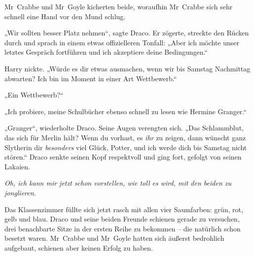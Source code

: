 Mr~Crabbe und Mr~Goyle kicherten beide, woraufhin Mr~Crabbe sich sehr schnell eine Hand vor den Mund schlug.

„Wir sollten besser Platz nehmen“, sagte Draco. Er zögerte, streckte den Rücken durch und sprach in einem etwas offizielleren Tonfall: „Aber ich möchte unser letztes Gespräch fortführen und ich akzeptiere deine Bedingungen.“

Harry nickte. „Würde es dir etwas ausmachen, wenn wir bis Samstag Nachmittag abwarten? Ich bin im Moment in einer Art Wettbewerb.“

„Ein Wettbewerb?“

„Ich probiere, meine Schulbücher ebenso schnell zu lesen wie Hermine Granger.“

„Granger“, wiederholte Draco. Seine Augen verengten sich. „Das Schlammblut, das sich für Merlin hält? Wenn du vorhast, es \emph{ihr} zu zeigen, dann wünscht ganz Slytherin dir \emph{besonders} viel Glück, Potter, und ich werde dich bis Samstag nicht stören.“ Draco senkte seinen Kopf respektvoll und ging fort, gefolgt von seinen Lakaien.

\emph{Oh, ich kann mir jetzt schon vorstellen, wie toll es wird, mit den beiden zu jonglieren.}

Das Klassenzimmer füllte sich jetzt rasch mit allen vier Saumfarben: grün, rot, gelb und blau. Draco und seine beiden Freunde schienen gerade zu versuchen, drei benachbarte Sitze in der ersten Reihe zu bekommen – die natürlich schon besetzt waren. Mr~Crabbe und Mr~Goyle hatten sich äußerst bedrohlich aufgebaut, schienen aber keinen Erfolg zu haben.

